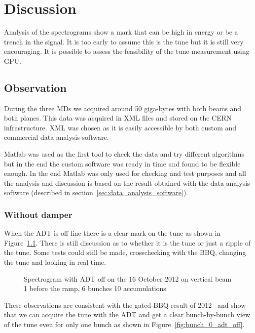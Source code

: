 
\glsresetall
\chapter{Discussion}

Analysis of the spectrograms show a mark that can be high in energy or be a trench in the signal. It is too early to assume this is the \gls{tune} but it is still very encouraging. It is possible to assess the feasibility of the tune measurement using \gls{GPU}.

\section{Observation}

During the three \glspl{MD} we acquired around 50 giga-bytes with both beams and both planes. This data was acquired in XML files and stored on the \gls{CERN} infrastructure. XML was chosen as it is easily accessible by both custom and commercial data analysis software.

Matlab was used as the first tool to check the data and try different algorithms but in the end the custom software was ready in time and found to be flexible enough. In the end Matlab was only used for checking and test purposes and all the analysis and discussion is based on the result obtained with the data analysis software (described in section~\ref{sec:data_analysis_software}).

\subsection{Without damper}

When the \gls{ADT} is off line there is a clear mark on the tune as shown in Figure~\ref{fig:adt_off}. There is still discussion as to whether it is the tune or just a ripple of the tune. Some tests could still be made, crosschecking with the \gls{BBQ}, changing the tune and looking in real time.

\begin{figure}[H]
\caption{Spectrogram with ADT off on the 16 October 2012 on vertical beam 1 before the ramp, 6 bunches 10 accumulations}
\label{fig:adt_off}
\centering
\end{figure}

These observations are consistent with the gated-\gls{BBQ} result of 2012~\cite{Valuch12} and show that we can acquire the tune with the \gls{ADT} and get a clear bunch-by-bunch view of the tune even for only one bunch as shown in Figure~\ref{fig:bunch_0_adt_off}.


